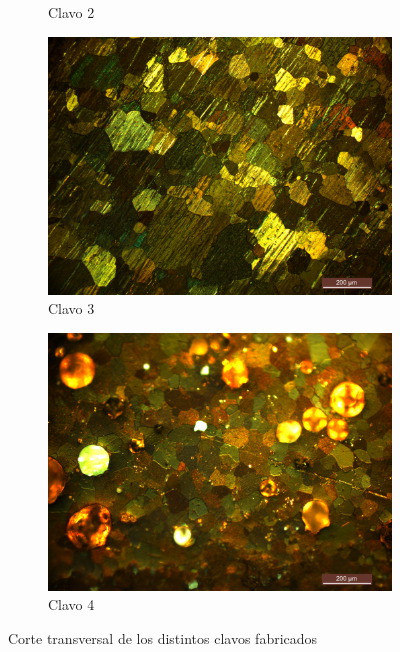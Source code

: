 \documentclass[a4paper,12pt,fleqn,twoside,openany]{book}
\begin{document}
\begin{figure}
\begin{subfigure}{0.3\textwidth}
        \caption{Clavo 2}%
        \label{fig: MClavo2}
    \end{subfigure}
    \newline
    \centering
        \begin{subfigure}{0.3\textwidth}
        \includegraphics[width=\textwidth]{Img/Resultados/clavos/tg/Clavo3.jpg}
        \caption{Clavo 3}%
        \label{fig: MClavo3}
    \end{subfigure}
        \begin{subfigure}{0.3\textwidth}
        \includegraphics[width=\textwidth]{Img/Resultados/clavos/tg/Clavo4.jpg}
        \caption{Clavo 4}%
        \label{fig: MClavo4}
    \end{subfigure}    
    \caption{Corte transversal de los distintos clavos fabricados }
    \end{figure}
\end{document}

